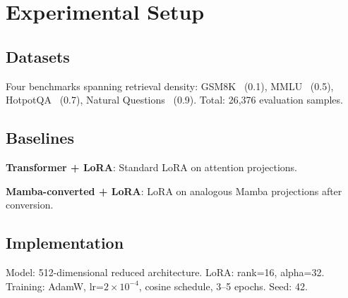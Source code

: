 \section{Experimental Setup}

\subsection{Datasets}

Four benchmarks spanning retrieval density: GSM8K~\cite{cobbe2021gsm8k} (0.1), MMLU~\cite{hendrycks2021mmlu} (0.5), HotpotQA~\cite{yang2018hotpotqa} (0.7), Natural Questions~\cite{kwiatkowski2019nq} (0.9). Total: 26,376 evaluation samples.

\subsection{Baselines}

\textbf{Transformer + LoRA}: Standard LoRA on attention projections.

\textbf{Mamba-converted + LoRA}: LoRA on analogous Mamba projections after conversion.

\subsection{Implementation}

Model: 512-dimensional reduced architecture. LoRA: rank=16, alpha=32. Training: AdamW, lr=$2 \times 10^{-4}$, cosine schedule, 3--5 epochs. Seed: 42.
